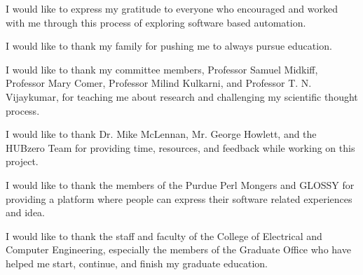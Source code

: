 %
%
%
%
%


\begin{acknowledgments}

I would like to express my gratitude to everyone who encouraged and worked with
me through this process of exploring software based automation.

I would like to thank my family for pushing me to always pursue education.

I would like to thank my committee members, Professor Samuel Midkiff, Professor
Mary Comer, Professor Milind Kulkarni, and Professor T. N. Vijaykumar, for
teaching me about research and challenging my scientific thought process.

I would like to thank Dr. Mike McLennan, Mr. George Howlett, and the HUBzero
Team for providing time, resources, and feedback while working on this project.

I would like to thank the members of the Purdue Perl Mongers and GLOSSY for
providing a platform where people can express their software related
experiences and idea.

I would like to thank the staff and faculty of the College of Electrical and
Computer Engineering, especially the members of the Graduate Office who have
helped me start, continue, and finish my graduate education.

\end{acknowledgments}

